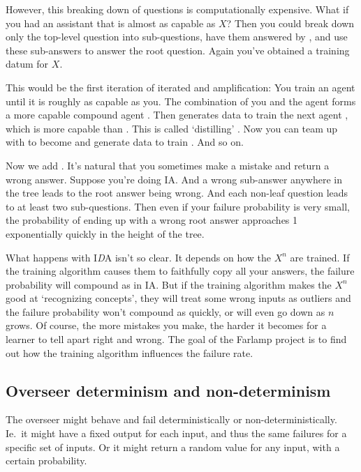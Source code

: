 \documentclass{farlamp}
\begin{document}
However, this breaking down of questions is computationally expensive. What if
you had an assistant  that is almost as capable as $X$? Then you could
break down only the top-level question into sub-questions, have them answered by
, and use these sub-answers to answer the root question. Again you've
obtained a training datum for $X$.

This would be the first iteration of iterated  and
amplification: You train an agent  until it is roughly as capable as you.
The combination of you and the agent forms a more capable compound agent
. Then  generates data to train the next agent , which is
more capable than . This is called ‘distilling’ . Now you can team
up with  to become  and generate data to train . And so on.

Now we add . It's natural that you sometimes make a mistake and
return a wrong answer. Suppose you're doing IA. And a wrong sub-answer anywhere
in the tree leads to the root answer being wrong. And each non-leaf question
leads to at least two sub-questions. Then even if your failure probability is
very small, the probability of ending up with a wrong root answer approaches 1
exponentially quickly in the height of the tree.~\parencite{ChriRelAmp}

What happens with I\emph{D}A isn't so clear. It depends on how the $X^n$ are
trained. If the training algorithm causes them to faithfully copy all your
answers, the failure probability will compound as in IA. But if the training
algorithm makes the $X^n$ good at ‘recognizing concepts’, they will treat some
wrong inputs as outliers and the failure probability won't compound as quickly,
or will even go down as $n$ grows. Of course, the more mistakes you make, the
harder it becomes for a learner to tell apart right and wrong. The goal of the
Farlamp project is to find out how the training algorithm influences the failure
rate.


\subsection{Overseer determinism and non-determinism}

The overseer might behave and fail deterministically or non-deterministically.
Ie.\ it might have a fixed output for each input, and thus the same failures for
a specific set of inputs. Or it might return a random value for any input,
with a certain probability.
\end{document}
